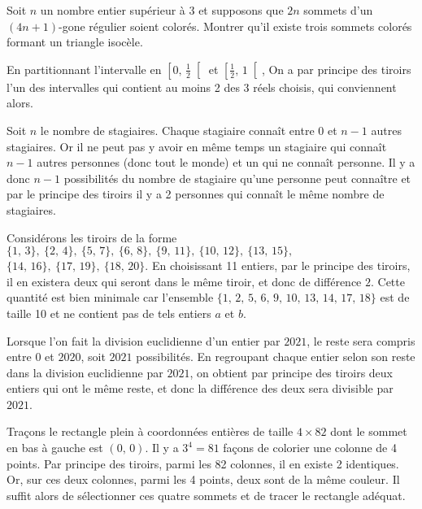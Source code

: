 \begin{exo}
Soit $n$ un nombre entier supérieur à 3 et supposons que $2n$ sommets d'un $(4n + 1)$-gone régulier soient colorés. Montrer qu'il existe trois sommets colorés formant un triangle isocèle.
\end{exo}

\bigskip



\begin{sol}
En partitionnant l'intervalle en $\left[0, \, \frac12\right[$ et $\left[\frac12, \, 1\right[$, On a par principe des tiroirs l'un des intervalles qui contient au moins 2 des 3 réels choisis, qui conviennent alors.
\end{sol}


\begin{sol}
Soit $n$ le nombre de stagiaires. Chaque stagiaire connaît entre $0$ et $n - 1$ autres stagiaires. Or il ne peut pas y avoir en même temps un stagiaire qui connaît $n - 1$ autres personnes (donc tout le monde) et un qui ne connaît personne. Il y a donc $n-1$ possibilités du nombre de stagiaire qu'une personne peut connaître et par le principe des tiroirs il y a 2 personnes qui connaît le même nombre de stagiaires.
\end{sol}


\begin{sol}
Considérons les tiroirs de la forme $\{1, \, 3\}, \ \{2, \, 4\}, \ \{5, \, 7\}, \ \{6, \, 8\}, \ \{9, \, 11\}, \ \{10, \, 12\}, \ \{13, \, 15\},$ $\{14, \, 16\}, \ \{17, \, 19\}, \ \{18, \, 20\}$. En choisissant 11 entiers, par le principe des tiroirs, il en existera deux qui seront dans le même tiroir, et donc de différence $2$. Cette quantité est bien minimale car l'ensemble $\{1, \, 2, \, 5, \, 6, \, 9, \, 10, \, 13, \, 14, \, 17, \, 18\}$ est de taille 10 et ne contient pas de tels entiers $a$ et $b$.
\end{sol}

\begin{sol}
Lorsque l'on fait la division euclidienne d'un entier par $2021$, le reste sera compris entre $0$ et $2020$, soit $2021$ possibilités. En regroupant chaque entier selon son reste dans la division euclidienne par $2021$, on obtient par principe des tiroirs deux entiers qui ont le même reste, et donc la différence des deux sera divisible par $2021$.
\end{sol}

\begin{sol}
Traçons le rectangle plein à coordonnées entières de taille $4 \times 82$ dont le sommet en bas à gauche est $(0, \, 0)$. Il y a $3^4 = 81$ façons de colorier une colonne de 4 points. Par principe des tiroirs, parmi les 82 colonnes, il en existe 2 identiques. Or, sur ces deux colonnes, parmi les 4 points, deux sont de la même couleur. Il suffit alors de sélectionner ces quatre sommets et de tracer le rectangle adéquat.
\end{sol}

